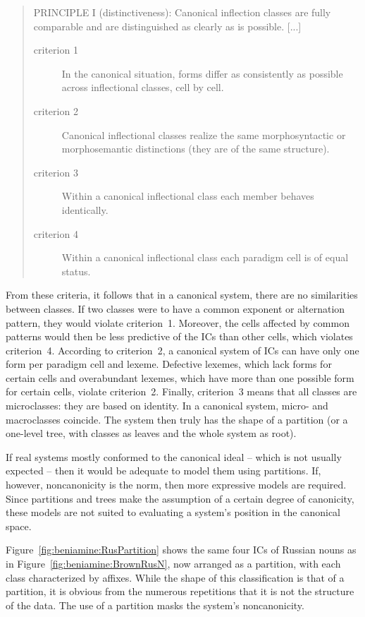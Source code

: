 \documentclass[output=paper]{langscibook}
\begin{document}
    \begin{quote}
        PRINCIPLE I (distinctiveness): Canonical inflection classes are fully comparable and are distinguished as clearly as is possible.
        [...]
        \begin{description}
            \item[criterion 1] In the canonical situation, forms differ as consistently as possible across
            inflectional classes, cell by cell. 
            \item[criterion 2] Canonical inflectional classes realize the same morphosyntactic or
            morphosemantic distinctions (they are of the same structure).
            \item[criterion 3] Within a canonical inflectional class each member behaves identically.
            \item[criterion 4] Within a canonical inflectional class each paradigm cell is of equal status.
        \end{description}
    \end{quote}
    
    From these criteria, it follows that in a canonical system, there are no similarities between classes. If two classes were to have a common exponent or alternation pattern, they would violate criterion~1. Moreover, the cells affected by common patterns would then be less predictive of the ICs than other cells, which violates criterion~4. According to criterion~2, a canonical system of ICs can have only one form per paradigm cell and lexeme. Defective lexemes, which lack forms for certain cells and overabundant lexemes, which have more than one possible form for certain cells, violate criterion~2. Finally, criterion~3 means that all classes are microclasses: they are based on identity. In a canonical system, micro- and macroclasses coincide. The system then truly has the shape of a partition (or a one-level tree, with classes as leaves and the whole system as root). 
    
    If real systems mostly conformed to the canonical ideal -- which is not usually expected -- then it would be adequate to model them using partitions. If, however, noncanonicity is the norm, then more expressive models are required. Since partitions and trees make the assumption of a certain degree of canonicity, these models are not suited to evaluating a system's position in the canonical space.
    
    Figure~\ref{fig:beniamine:RusPartition} shows the same four ICs of Russian nouns as in Figure~\ref{fig:beniamine:BrownRusN}, now arranged as a partition, with each class characterized by affixes. While the shape of this classification is that of a partition, it is obvious from the numerous repetitions that it is not the structure of the data. The use of a partition masks the system's noncanonicity. 
    
\end{document}
